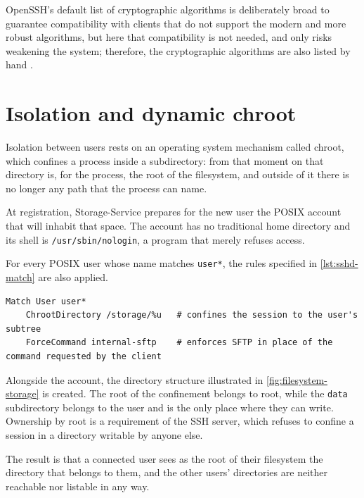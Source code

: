 OpenSSH's default list of cryptographic algorithms \cite{openssh-sshd-config} is deliberately broad
to guarantee compatibility with clients that do not support the modern and more robust algorithms, but here that
compatibility is not needed, and only risks weakening the system; therefore, the cryptographic
algorithms are also listed by hand \cite{ramusb-code-sshd-config}.

\section{Isolation and dynamic chroot}
\label{sec:isolamento}

Isolation between users rests on an operating system mechanism called chroot, which
confines a process inside a subdirectory: from that moment on that directory is, for the process, the
root of the filesystem, and outside of it there is no longer any path that the process can
name.

At registration, Storage-Service prepares for the new user the POSIX account that will inhabit that
space. The account has no traditional home directory and its shell is \texttt{/usr/sbin/nologin},
a program that merely refuses access.

For every POSIX user whose name matches \texttt{user*}, the rules
specified in \autoref{lst:sshd-match} are also applied.

\begin{lstlisting}[language=sshdconfig, caption={The two per-user directives, from
\texttt{sshd\_config} \cite{ramusb-code-sshd-config}, with added comments.},
label={lst:sshd-match}]
Match User user*
    ChrootDirectory /storage/%u   # confines the session to the user's subtree
    ForceCommand internal-sftp    # enforces SFTP in place of the command requested by the client
\end{lstlisting}

Alongside the account, the directory structure illustrated in
\autoref{fig:filesystem-storage} is created. The root of the confinement belongs to root, while the
\texttt{data} subdirectory belongs to the user and is the only place where they can write.
Ownership by root is a requirement of the SSH server, which
refuses to confine a session in a directory writable by anyone else.

The result is that a connected user sees as the root of their filesystem the directory that
belongs to them, and the other users' directories are neither reachable nor listable in any way.


